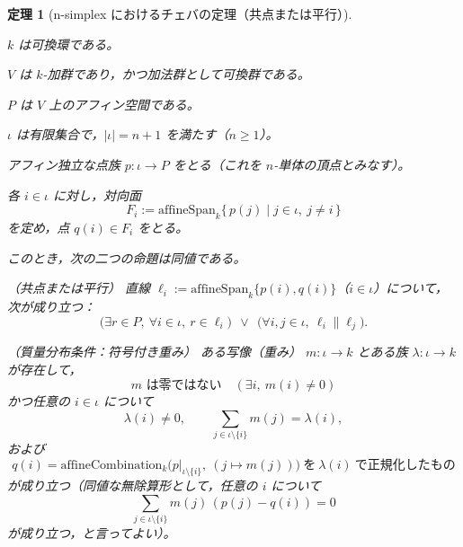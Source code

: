 \documentclass[a4paper,12pt]{bxjsbook}
\theoremstyle{theorem}
\newtheorem{theorem}{定理}[chapter]
\begin{document}
    \begin{theorem}[n-simplex におけるチェバの定理（共点または平行）]
      \begin{theoremenumerate}[label=(P\arabic*), leftmargin=4em, topsep=2pt, partopsep=0pt,
        itemsep=0pt, parsep=0pt]
        \item $k$ は可換環である。
        \item $V$ は $k$-加群であり，かつ加法群として可換群である。
        \item $P$ は $V$ 上のアフィン空間である。
        \item $\iota$ は有限集合で，$|\iota|=n+1$ を満たす（$n\ge 1$）。
        \item アフィン独立な点族 $p:\iota\to P$ をとる（これを $n$-単体の頂点とみなす）。
        \item 各 $i\in\iota$ に対し，対向面
          \[
            F_i := \mathrm{affineSpan}_k\{\,p(j)\mid j\in\iota,\ j\neq i\,\}
          \]
          を定め，点 $q(i)\in F_i$ をとる。
      \end{theoremenumerate}
      
      このとき，次の二つの命題は同値である。
      
      \begin{theoremitemize}[leftmargin=4em, topsep=2pt, partopsep=0pt, itemsep=0pt, parsep=0pt]
        \item[(A)] （共点または平行）
        直線 $\ell_i := \mathrm{affineSpan}_k\{p(i),q(i)\}$（$i\in\iota$）について，
        次が成り立つ：
        \[
          \Big(\exists r\in P,\ \forall i\in\iota,\ r\in \ell_i\Big)
          \ \ \lor\ \
          \Big(\forall i,j\in\iota,\ \ell_i\parallel \ell_j\Big).
        \]
        \item[(B)] （質量分布条件：符号付き重み）
        ある写像（重み） $m:\iota\to k$ とある族 $\lambda:\iota\to k$ が存在して，
        \[
          \text{$m$ は零ではない}\quad(\exists i,\ m(i)\neq 0)
        \]
        かつ任意の $i\in\iota$ について
        \[
          \lambda(i)\neq 0,\qquad
          \sum_{j\in\iota\setminus\{i\}} m(j)=\lambda(i),
        \]
        および
        \[
          q(i)=\mathrm{affineCombination}_k\bigl(p|_{\iota\setminus\{i\}},\ 
            (j\mapsto m(j))\bigr)\ \text{を}\ \lambda(i)\ \text{で正規化したもの}
        \]
        が成り立つ（同値な無除算形として，任意の $i$ について
        \[
          \sum_{j\in\iota\setminus\{i\}} m(j)\,(p(j)-q(i))=0
        \]
        が成り立つ，と言ってよい）。
      \end{theoremitemize}
      \end{theorem}
      
\end{document}
